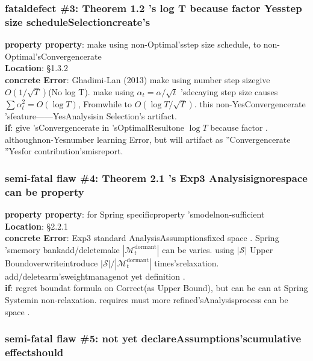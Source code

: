 \documentclass[
  12pt,
]{article}
\begin{document}
\subsubsection{fataldefect \#3: Theorem 1.2 's log T
because factor Yesstep size scheduleSelectioncreate's}\label{ux81f4ux547dux7f3aux9677-3-theorem-1.2-ux7684-log-t-ux56e0ux5b50ux662fux6b65ux957fux8c03ux5ea6ux9009ux62e9ux9020ux6210ux7684}

\textbf{property property}: make using non-Optimal'sstep size schedule, to non-Optimal'sConvergencerate \\
\textbf{Location}: §1.3.2\\
\textbf{concrete Error}: Ghadimi-Lan (2013) make using number step sizegive 
\(O(1/\sqrt{T})\)(No log T). make using  \(\alpha_t = \alpha/\sqrt{t}\)
'sdecaying step size causes \(\sum \alpha_t^2 = O(\log T)\), Fromwhile to 
\(O(\log T/\sqrt{T})\). this non-YesConvergencerate 'sfeature------YesAnalysisin Selection's
artifact. \\
\textbf{if}: give 'sConvergencerate in 'sOptimalResultone  \(\log T\)
because factor . althoughnon-Yesnumber learning Error, but will  artifact as ''Convergencerate ''Yesfor contribution'smisreport. 

\subsubsection{semi-fatal flaw \#4: Theorem 2.1 's Exp3
Analysisignorespace can be property }\label{ux534aux81f4ux547dux7f3aux9677-4-theorem-2.1-ux7684-exp3-ux5206ux6790ux5ffdux7565ux52a8ux4f5cux7a7aux95f4ux53efux53d8ux6027}

\textbf{property property}: for  Spring specificproperty 'smodelnon-sufficient\\
\textbf{Location}: §2.2.1\\
\textbf{concrete Error}: Exp3 standard AnalysisAssumptionsfixed space . Spring
'smemory bankadd/deletemake  \(|\mathcal{M}_t^{\text{dormant}}|\) can be varies. using 
\(|\mathcal{S}|\) Upper Boundoverwriteintroduce 
\(|\mathcal{S}|/|\mathcal{M}_t^{\text{dormant}}|\)
times'srelaxation. add/deletearm'sweightmanagenot yet definition . \\
\textbf{if}: regret boundat formula on Correct(as Upper Bound), but can be can at  Spring
Systemin non-relaxation. requires must more refined'sAnalysisprocess can be space . 

\subsubsection{semi-fatal flaw \#5:
not yet declareAssumptions'scumulative effectshould }\label{ux534aux81f4ux547dux7f3aux9677-5-ux672aux58f0ux660eux5047ux8bbeux7684ux7d2fux79efux6548ux5e94}
\end{document}
